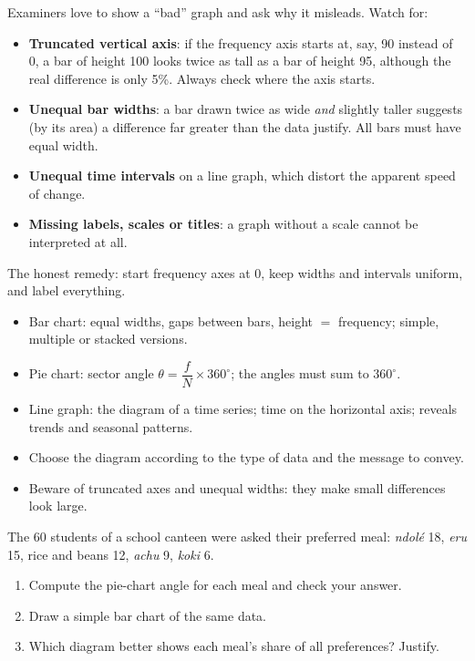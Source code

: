 \documentclass[11pt]{article}
\begin{document}
\begin{attention}
Examiners love to show a ``bad'' graph and ask why it misleads. Watch for:
\begin{itemize}
\item \textbf{Truncated vertical axis}: if the frequency axis starts at, say, 90 instead of 0, a bar of height 100 looks twice as tall as a bar of height 95, although the real difference is only 5\%. Always check where the axis starts.
\item \textbf{Unequal bar widths}: a bar drawn twice as wide \emph{and} slightly taller suggests (by its area) a difference far greater than the data justify. All bars must have equal width.
\item \textbf{Unequal time intervals} on a line graph, which distort the apparent speed of change.
\item \textbf{Missing labels, scales or titles}: a graph without a scale cannot be interpreted at all.
\end{itemize}
The honest remedy: start frequency axes at 0, keep widths and intervals uniform, and label everything.
\end{attention}

\begin{aretenir}
\begin{itemize}
\item Bar chart: equal widths, gaps between bars, height $=$ frequency; simple, multiple or stacked versions.
\item Pie chart: sector angle $\theta=\dfrac{f}{N}\times360^{\circ}$; the angles must sum to $360^{\circ}$.
\item Line graph: the diagram of a time series; time on the horizontal axis; reveals trends and seasonal patterns.
\item Choose the diagram according to the type of data and the message to convey.
\item Beware of truncated axes and unequal widths: they make small differences look large.
\end{itemize}
\end{aretenir}

\begin{exercice}
The 60 students of a school canteen were asked their preferred meal: \emph{ndol\'e} 18, \emph{eru} 15, rice and beans 12, \emph{achu} 9, \emph{koki} 6.
\begin{enumerate}
\item Compute the pie-chart angle for each meal and check your answer.
\item Draw a simple bar chart of the same data.
\item Which diagram better shows each meal's share of all preferences? Justify.
\end{enumerate}
\end{exercice}
\end{document}
